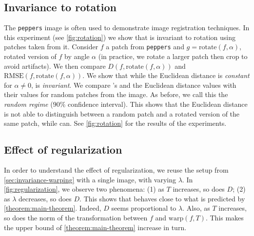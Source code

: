 \subsection{Invariance to rotation}\label{sec:invariance-rotation}
The \texttt{peppers} image is often used to demonstrate image registration techniques. In this experiment (see \cref{fig:rotation}) we show that \Diffy is invariant to rotation using patches taken from it. Consider $f$ a patch from \texttt{peppers} and $g = \text{rotate}(f, \alpha)$, rotated version of $f$ by angle $\alpha$ (in practice, we rotate a larger patch then crop to avoid artifacts). We then compare $D(f, \text{rotate}(f, \alpha))$ and $\textrm{RMSE}(f, \text{rotate}(f, \alpha))$. We show that while the Euclidean distance is \emph{constant} for $\alpha \neq 0$, \Diffy is \emph{invariant}. We compare \Diffy's and the Euclidean distance values with their values for random patches from the image. As before, we call this the \emph{random regime} ($90\%$ confidence interval). This shows that the Euclidean distance is not able to distinguish between a random patch and a rotated version of the same patch, while \Diffy can. See \cref{fig:rotation} for the results of the experiments.

\subsection{Effect of regularization}\label{sec:regularization}
In order to understand the effect of regularization, we reuse the setup from \cref{sec:invariance-warping} with a single image, with varying $\lambda$. In \cref{fig:regularization}, we observe two phenomena: (1) as $T$ increases, so does $D$; (2) as $\lambda$ decreases, so does $D$. This shows that \Diffy behaves close to what is predicted by \cref{theorem:main-theorem}. Indeed, $D$ seems proportional to $\lambda$. Also, as $T$ increases, so does the norm of the transformation between $f$ and $\text{warp}(f, T)$. This makes the upper bound of \cref{theorem:main-theorem} increase in turn.
